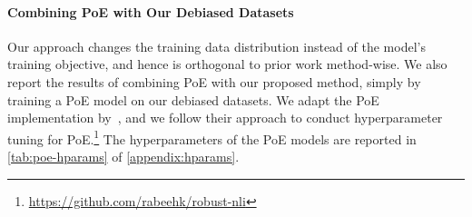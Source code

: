 \paragraph{Combining PoE with Our Debiased Datasets}
Our approach changes the training data distribution instead of the model's training objective, and hence is orthogonal to prior work method-wise.
We also report the results of combining PoE with our proposed method, simply by training a PoE model on our debiased datasets.
We adapt the PoE implementation by~\citet{karimi-mahabadi-etal-2020-end}, and we follow their approach to conduct hyperparameter tuning for PoE.\footnote{\url{https://github.com/rabeehk/robust-nli}}
The hyperparameters of the PoE models are reported in \cref{tab:poe-hparams} of \cref{appendix:hparams}.


\begin{table}[bt]
\begin{center}
\caption{Accuracy on SNLI and SNLI-hard.  are reported results and underscore indicates statistical significance against the baseline.
Training on our debiased SNLI datasets significantly boosts the performance on SNLI-hard compared to the baseline, and it improves further when combined with PoE.} \label{tab:snli-results}
\end{center}
\end{table}


